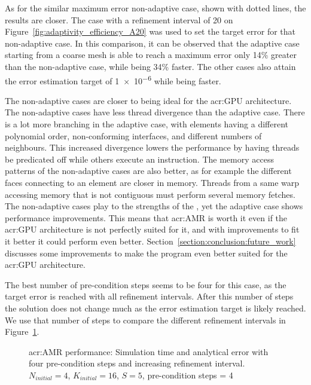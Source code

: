 As for the similar maximum error non-adaptive case, shown with dotted lines, the results are closer.
The case with a refinement interval of 20 on Figure~\ref{fig:adaptivity_efficiency_A20} was used to
set the target error for that non-adaptive case. In this comparison, it can be observed that the
adaptive case starting from a coarse mesh is able to reach a maximum error only 14\% greater than
the non-adaptive case, while being 34\% faster. The other cases also attain the error estimation
target of \num{1e-6} while being faster.

The non-adaptive cases are closer to being ideal for the \acrshort{acr:GPU} architecture. The
non-adaptive cases have less thread divergence than the adaptive case. There is a lot more branching
in the adaptive case, with elements having a different polynomial order, non-conforming interfaces,
and different numbers of neighbours. This increased divergence lowers the performance by having
threads be predicated off while others execute an instruction. The memory access patterns of the
non-adaptive cases are also better, as for example the different faces connecting to an element are
closer in memory. Threads from a same warp accessing memory that is not contiguous must perform
several memory fetches. The non-adaptive cases play to the strengths of the ,
yet the adaptive case shows performance improvements. This means that \acrshort{acr:AMR} is worth it
even if the \acrshort{acr:GPU} architecture is not perfectly suited for it, and with improvements to
fit it better it could perform even better. Section~\ref{section:conclusion:future_work} discusses
some improvements to make the program even better suited for the \acrshort{acr:GPU} architecture.

The best number of pre-condition steps seems to be four for this case, as the target error is
reached with all refinement intervals. After this number of steps the solution does not change much
as the error estimation target is likely reached. We use that number of steps to compare the
different refinement intervals in Figure~\ref{fig:adaptivity_efficiency_C4}.

\begin{figure}[H]
	\centering
	\hfill
	\caption{\Acrlong{acr:AMR} performance: Simulation time and analytical error with four pre-condition steps and increasing refinement interval. \(N_{initial} = 4\), \(K_{initial} = 16\), \(S = 5\), pre-condition steps = 4}\label{fig:adaptivity_efficiency_C4}
\end{figure}

